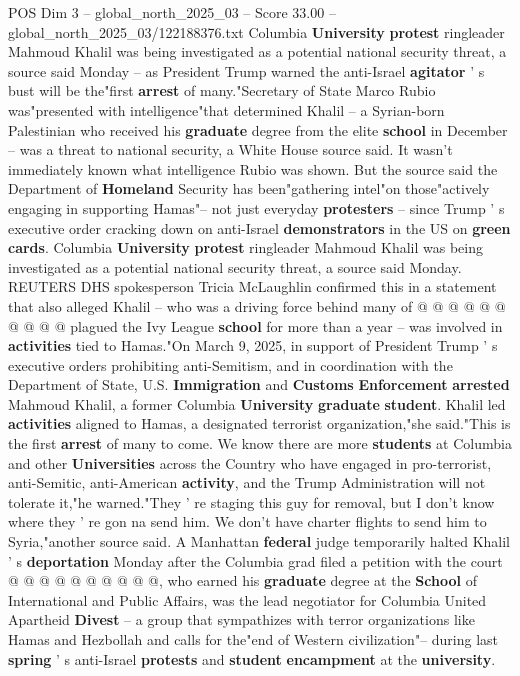 \begin{textsample}{POS Dim 3 – global\_north\_2025\_03 – Score 33.00 – global\_north\_2025\_03/122188376.txt}  \label{ex:f3_pos_029}
Columbia \textbf{University} \textbf{protest} ringleader Mahmoud Khalil was being investigated as a potential national security threat, a source said Monday -- as President Trump warned the anti-Israel \textbf{agitator} ' s bust will be the"first \textbf{arrest} of many."Secretary of State Marco Rubio was"presented with intelligence"that determined Khalil -- a Syrian-born Palestinian who received his \textbf{graduate} degree from the elite \textbf{school} in December -- was a threat to national security, a White House source said.
It wasn't immediately known what intelligence Rubio was shown.
But the source said the Department of \textbf{Homeland} Security has been"gathering intel"on those"actively engaging in supporting Hamas"-- not just everyday \textbf{protesters} -- since Trump ' s executive order cracking down on anti-Israel \textbf{demonstrators} in the US on \textbf{green} \textbf{cards}.
Columbia \textbf{University} \textbf{protest} ringleader Mahmoud Khalil was being investigated as a potential national security threat, a source said Monday.
REUTERS DHS spokesperson Tricia McLaughlin confirmed this in a statement that also alleged Khalil -- who was a driving force behind many of @ @ @ @ @ @ @ @ @ @ plagued the Ivy League \textbf{school} for more than a year -- was involved in \textbf{activities} tied to Hamas."On March 9, 2025, in support of President Trump ' s executive orders prohibiting anti-Semitism, and in coordination with the Department of State, U.S. \textbf{Immigration} and \textbf{Customs} \textbf{Enforcement} \textbf{arrested} Mahmoud Khalil, a former Columbia \textbf{University} \textbf{graduate} \textbf{student}.
Khalil led \textbf{activities} aligned to Hamas, a designated terrorist organization,"she said."This is the first \textbf{arrest} of many to come.
We know there are more \textbf{students} at Columbia and other \textbf{Universities} across the Country who have engaged in pro-terrorist, anti-Semitic, anti-American \textbf{activity}, and the Trump Administration will not tolerate it,"he warned."They ' re staging this guy for removal, but I don't know where they ' re gon na send him.
We don't have charter flights to send him to Syria,"another source said.
A Manhattan \textbf{federal} judge temporarily halted Khalil ' s \textbf{deportation} Monday after the Columbia grad filed a petition with the court @ @ @ @ @ @ @ @ @ @, who earned his \textbf{graduate} degree at the \textbf{School} of International and Public Affairs, was the lead negotiator for Columbia United Apartheid \textbf{Divest} -- a group that sympathizes with terror organizations like Hamas and Hezbollah and calls for the"end of Western civilization"-- during last \textbf{spring} ' s anti-Israel \textbf{protests} and \textbf{student} \textbf{encampment} at the \textbf{university}.

\end{textsample}
